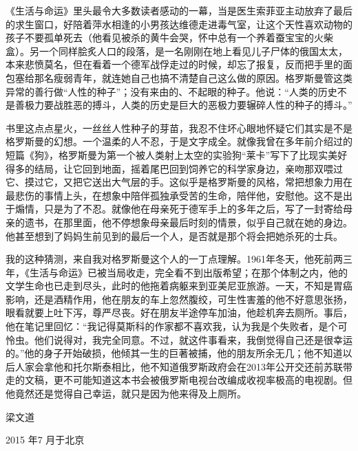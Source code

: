 《生活与命运》里头最令大多数读者感动的一幕，当是医生索菲亚主动放弃了最后的求生窗口，好陪着萍水相逢的小男孩达维德走进毒气室，让这个天性喜欢动物的孩子不要孤单死去（他看见被杀的黄牛会哭，怀中总有一个养着蚕宝宝的火柴盒）。另一个同样脍炙人口的段落，是一名刚刚在地上看见儿子尸体的俄国太太，本来悲愤莫名，但在看着一个德军战俘走过的时候，却忘了报复，反而把手里的面包塞给那名瘦弱青年，就连她自己也搞不清楚自己这么做的原因。格罗斯曼管这类异常的善行做“人性的种子”；没有来由的、不起眼的种子。他说：“人类的历史不是善极力要战胜恶的搏斗，人类的历史是巨大的恶极力要辗碎人性的种子的搏斗。”

书里这点点星火，一丝丝人性种子的芽苗，我忍不住坏心眼地怀疑它们其实是不是格罗斯曼的幻想。一个温柔的人不忍，于是文字成全。就像我曾在多年前介绍过的短篇《狗》，格罗斯曼为第一个被人类射上太空的实验狗“莱卡”写下了比现实美好得多的结局，让它回到地面，摇着尾巴回到饲养它的科学家身边，亲吻那双喂过它、摸过它，又把它送出大气层的手。这似乎是格罗斯曼的风格，常把想象力用在最悲伤的事情上头，在想象中陪伴孤独承受苦的生命，陪伴他，安慰他。这不是出于煽情，只是为了不忍。就像他在母亲死于德军手上的多年之后，写了一封寄给母亲的遗书，在那里面，他不停想象母亲最后时刻的情景，似乎自己就在她的身边。他甚至想到了妈妈生前见到的最后一个人，是否就是那个将会把她杀死的士兵。

我的这种猜测，来自我对格罗斯曼这个人的一丁点理解。1961年冬天，他死前两三年，《生活与命运》已被当局收走，完全看不到出版希望；在那个体制之内，他的文学生命也已走到尽头，此时的他拖着病躯来到亚美尼亚旅游。一天，不知是胃癌影响，还是酒精作用，他在朋友的车上忽然腹绞，可生性害羞的他不好意思张扬，眼看就要上吐下泻，尊严尽丧。好在朋友半途停车加油，他趁机奔去厕所。事后，他在笔记里回忆：“我记得莫斯科的作家都不喜欢我，认为我是个失败者，是个可怜虫。他们说得对，我完全同意。不过，就这件事看来，我倒觉得自己还是很幸运的。”他的身子开始破损，他倾其一生的巨著被捕，他的朋友所余无几；他不知道以后人家会拿他和托尔斯泰相比，他不知道俄罗斯政府会在2013年公开交还前苏联带走的文稿，更不可能知道这本书会被俄罗斯电视台改编成收视率极高的电视剧。但他竟然还是觉得自己幸运，就只是因为他来得及上厕所。

梁文道

2015 年7 月于北京

